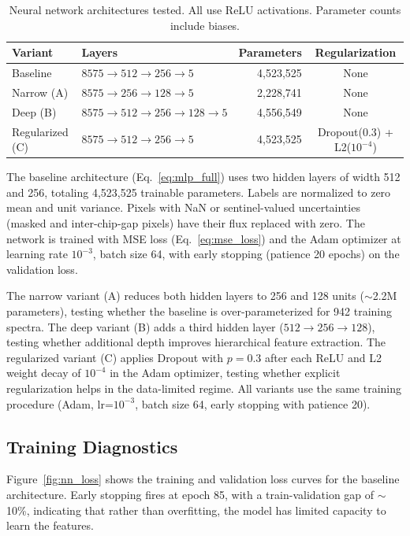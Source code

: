 \documentclass[10pt,preprint2]{aastex}
\begin{document}
\begin{table}[ht!]
\centering
\caption{Neural network architectures tested. All use ReLU activations. Parameter counts include biases.\label{tab:nn_arch_specs}}
\begin{tabular}{llrc}
\toprule
Variant & Layers & Parameters & Regularization \\
\midrule
Baseline & $8575 \to 512 \to 256 \to 5$ & 4,523,525 & None \\
Narrow (A) & $8575 \to 256 \to 128 \to 5$ & 2,228,741 & None \\
Deep (B) & $8575 \to 512 \to 256 \to 128 \to 5$ & 4,556,549 & None \\
Regularized (C) & $8575 \to 512 \to 256 \to 5$ & 4,523,525 & Dropout(0.3) + L2($10^{-4}$) \\
\bottomrule
\end{tabular}
\end{table}

The baseline architecture (Eq.~\ref{eq:mlp_full}) uses two hidden layers of width 512 and 256, totaling 4,523,525 trainable parameters. Labels are normalized to zero mean and unit variance. Pixels with NaN or sentinel-valued uncertainties (masked and inter-chip-gap pixels) have their flux replaced with zero. The network is trained with MSE loss (Eq.~\ref{eq:mse_loss}) and the Adam optimizer \citep{Kingma2015} at learning rate $10^{-3}$, batch size 64, with early stopping (patience 20 epochs) on the validation loss.

The narrow variant (A) reduces both hidden layers to 256 and 128 units ($\sim$2.2M parameters), testing whether the baseline is over-parameterized for 942 training spectra. The deep variant (B) adds a third hidden layer ($512 \to 256 \to 128$), testing whether additional depth improves hierarchical feature extraction. The regularized variant (C) applies Dropout \citep{Srivastava2014} with $p = 0.3$ after each ReLU and L2 weight decay of $10^{-4}$ in the Adam optimizer, testing whether explicit regularization helps in the data-limited regime. All variants use the same training procedure (Adam, lr=$10^{-3}$, batch size 64, early stopping with patience 20).

\subsection{Training Diagnostics}

Figure~\ref{fig:nn_loss} shows the training and validation loss curves for the baseline architecture. Early stopping fires at epoch 85, with a train-validation gap of $\sim$10\%, indicating that rather than overfitting, the model has limited capacity to learn the features.
\end{document}
